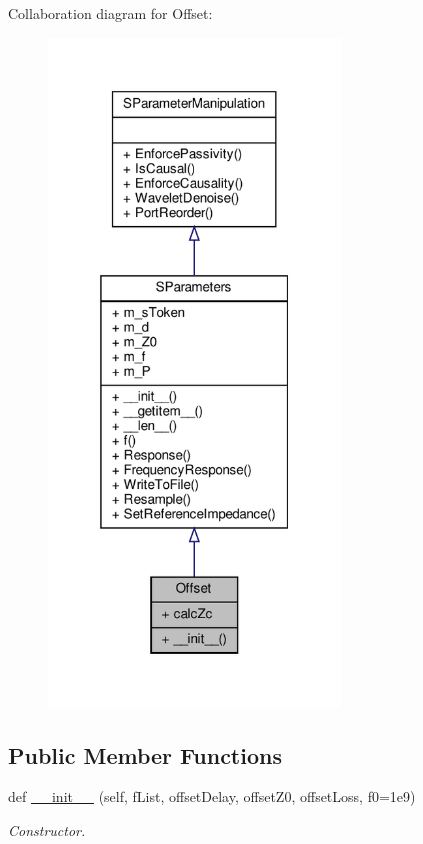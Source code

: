 Collaboration diagram for Offset\+:
\nopagebreak
\begin{figure}[H]
\begin{center}
\leavevmode
\includegraphics[width=220pt]{classSignalIntegrity_1_1Measurement_1_1CalKit_1_1Standards_1_1Offset_1_1Offset__coll__graph}
\end{center}
\end{figure}
\subsection*{Public Member Functions}
\begin{DoxyCompactItemize}
\item 
def \hyperlink{classSignalIntegrity_1_1Measurement_1_1CalKit_1_1Standards_1_1Offset_1_1Offset_af11a9605224eedf1e907737dfa12fd37}{\+\_\+\+\_\+init\+\_\+\+\_\+} (self, f\+List, offset\+Delay, offset\+Z0, offset\+Loss, f0=1e9)
\begin{DoxyCompactList}\small\item\em Constructor. \end{DoxyCompactList}\end{DoxyCompactItemize}


